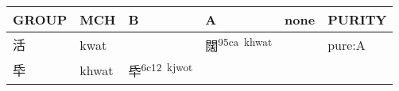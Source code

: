 \documentclass[14pt,a4paper]{scrartcl}
\begin{document}
\begin{longtable}[c]{@{}llllll@{}}
\toprule
\begin{minipage}[b]{0.14\columnwidth}\raggedright\strut
GROUP
\strut\end{minipage} &
\begin{minipage}[b]{0.14\columnwidth}\raggedright\strut
MCH
\strut\end{minipage} &
\begin{minipage}[b]{0.14\columnwidth}\raggedright\strut
B
\strut\end{minipage} &
\begin{minipage}[b]{0.14\columnwidth}\raggedright\strut
A
\strut\end{minipage} &
\begin{minipage}[b]{0.14\columnwidth}\raggedright\strut
none
\strut\end{minipage} &
\begin{minipage}[b]{0.14\columnwidth}\raggedright\strut
PURITY
\strut\end{minipage}\tabularnewline
\midrule
\endhead
\begin{minipage}[t]{0.14\columnwidth}\raggedright\strut
活
\strut\end{minipage} &
\begin{minipage}[t]{0.14\columnwidth}\raggedright\strut
kwat
\strut\end{minipage} &
\begin{minipage}[t]{0.14\columnwidth}\raggedright\strut
\strut\end{minipage} &
\begin{minipage}[t]{0.14\columnwidth}\raggedright\strut
闊\textsuperscript{95ca~khwat}
\strut\end{minipage} &
\begin{minipage}[t]{0.14\columnwidth}\raggedright\strut
\strut\end{minipage} &
\begin{minipage}[t]{0.14\columnwidth}\raggedright\strut
pure:A
\strut\end{minipage}\tabularnewline
\begin{minipage}[t]{0.14\columnwidth}\raggedright\strut
氒
\strut\end{minipage} &
\begin{minipage}[t]{0.14\columnwidth}\raggedright\strut
khwat
\strut\end{minipage} &
\begin{minipage}[t]{0.14\columnwidth}\raggedright\strut
氒\textsuperscript{6c12~kjwot}
\strut\end{minipage} &

\end{longtable}
\end{document}
